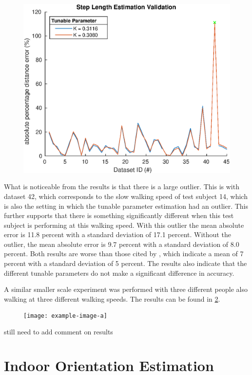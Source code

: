 \begin{figure}[H]
	\centering
	\includegraphics[width=0.6\linewidth]{images/20201028_1344_Step_Length_Estimation_Validation}
	\caption{}
	\label{fig:step_length_estimation_validation}
\end{figure}

What is noticeable from the results is that there is a large outlier. This is with dataset 42, which corresponds to the slow walking speed of test subject 14, which is also the setting in which the tunable parameter estimation had an outlier. This further supports that there is something significantly different when this test subject is performing at this walking speed. With this outlier the mean absolute error is 11.8 percent with a standard deviation of 17.1 percent. Without the outlier, the mean absolute error is 9.7 percent with a standard deviation of 8.0 percent. Both results are worse than those cited by \cite{Vezocnik2019}, which indicate a mean of 7 percent with a standard deviation of 5 percent.
The results also indicate that the different tunable parameters do not make a significant difference in accuracy. \par 
A similar smaller scale experiment was performed with three different people also walking at three different walking speeds. The results can be found in \cref{fig:step_length_personal_testing}. 
\begin{figure}[H]
	\centering
	\texttt{[image: example-image-a]}
	\caption{}
	\label{fig:step_length_personal_testing}
\end{figure}

{\color{red} still need to add comment on results }

\section{Indoor Orientation Estimation}

